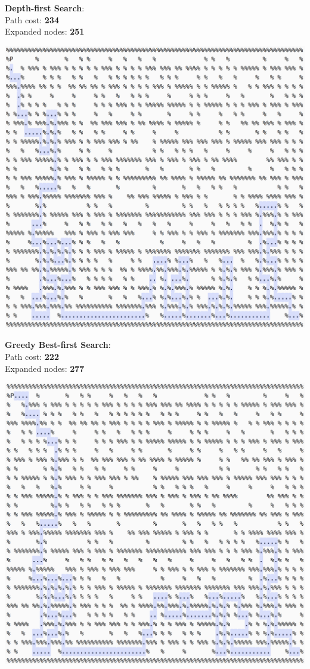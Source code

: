 \documentclass[11pt]{article}
\begin{document}
\textbf{Depth-first Search}:\\
Path cost: \textbf{234}\\
Expanded nodes: \textbf{251}
\begin{center}
\includegraphics[scale=0.6]{big-maze/dfs.png}
\end{center}
\pagebreak

\textbf{Greedy Best-first Search}:\\
Path cost: \textbf{222}\\
Expanded nodes: \textbf{277}
\begin{center}
\includegraphics[scale=0.6]{big-maze/gbfs.png}
\end{center}
\pagebreak
\end{document}
